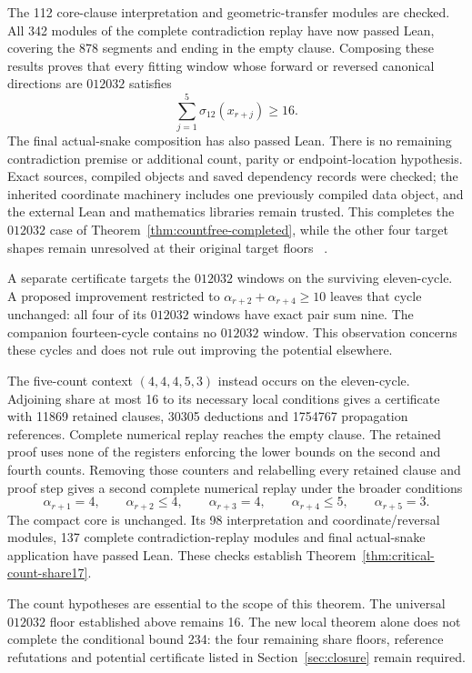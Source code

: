 \documentclass[11pt,a4paper]{article}
\theoremstyle{definition}
\theoremstyle{remark}
\begin{document}
The 112 core-clause interpretation and geometric-transfer modules are
checked. All 342 modules of the complete contradiction replay have now
passed Lean, covering the 878 segments and ending in the empty clause.
Composing these results proves that every fitting window whose forward
or reversed canonical directions are $012032$ satisfies
\[
\sum_{j=1}^{5}\sigma_{12}(x_{r+j})\ge16.
\]
The final actual-snake composition has also passed Lean. There is no
remaining contradiction premise or additional count, parity or
endpoint-location hypothesis. Exact sources, compiled objects and saved
dependency records were checked; the inherited coordinate machinery
includes one previously compiled data object, and the external Lean and
mathematics libraries remain trusted. This completes the $012032$ case
of Theorem~\ref{thm:countfree-completed}, while the other four target
shapes remain unresolved at their original target floors
~\cite{share150archive,pilot151archive,share152archive}.

A separate certificate targets the $012032$ windows on the surviving
eleven-cycle. A proposed improvement restricted to
$\alpha_{r+2}+\alpha_{r+4}\ge10$ leaves that cycle unchanged: all four
of its $012032$ windows have exact pair sum nine. The companion
fourteen-cycle contains no $012032$ window. This observation concerns
these cycles and does not rule out improving the potential elsewhere.

The five-count context $(4,4,4,5,3)$ instead occurs on the eleven-cycle.
Adjoining share at most 16 to its necessary local conditions gives a
certificate with 11869 retained clauses, 30305 deductions and 1754767
propagation references. Complete numerical replay reaches the empty clause.
The retained proof uses none of the registers enforcing the lower bounds
on the second and fourth counts. Removing those counters and relabelling
every retained clause and proof step gives a second complete numerical
replay under the broader conditions
\[
\alpha_{r+1}=4,\qquad \alpha_{r+2}\le4,\qquad
\alpha_{r+3}=4,\qquad \alpha_{r+4}\le5,\qquad
\alpha_{r+5}=3.
\]
The compact core is unchanged. Its 98 interpretation and coordinate/reversal
modules, 137 complete contradiction-replay modules and final actual-snake
application have passed Lean. These checks establish
Theorem~\ref{thm:critical-count-share17}.



The count hypotheses are essential to the scope of this theorem. The
universal $012032$ floor established above remains 16. The new local
theorem alone does not complete the conditional bound 234: the four
remaining share floors, reference refutations and potential certificate
listed in Section~\ref{sec:closure} remain required.
\end{document}
